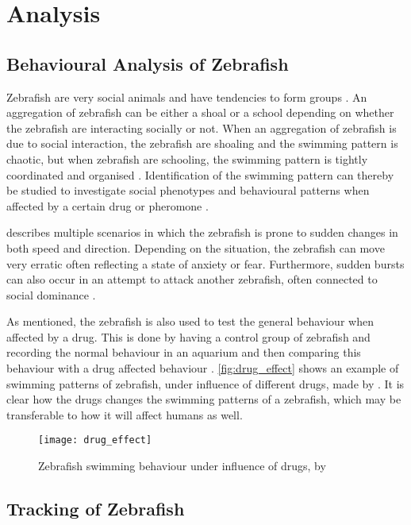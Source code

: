 \graphicspath{{figures/intro/}}
\chapter{Analysis}\label{ch:analysis}

\section{Behavioural Analysis of Zebrafish}
Zebrafish are very social animals and have tendencies to form groups \citep{RahmanKhan2018}. An aggregation of zebrafish can be either a shoal or a school depending on whether the zebrafish are interacting socially or not. When an aggregation of zebrafish is due to social interaction, the zebrafish are shoaling and the swimming pattern is chaotic, but when zebrafish are schooling, the swimming pattern is tightly coordinated and organised \citep{Miller2012a}. Identification of the swimming pattern can thereby be studied to investigate social phenotypes and behavioural patterns when affected by a certain drug or pheromone \citep{RahmanKhan2018}. 

\cite{Kalueff2013} describes multiple scenarios in which the zebrafish is prone to sudden changes in both speed and direction. Depending on the situation, the zebrafish can move very erratic often reflecting a state of anxiety or fear. Furthermore, sudden bursts can also occur in an attempt to attack another zebrafish, often connected to social dominance \citep{Kalueff2013}.

As mentioned, the zebrafish is also used to test the general behaviour when affected by a drug. This is done by having a control group of zebrafish and recording the normal behaviour in an aquarium and then comparing this behaviour with a drug affected behaviour \citep{Stewart2015}. \autoref{fig:drug_effect} shows an example of swimming patterns of zebrafish, under influence of different drugs, made by \cite{Stewart2015}. It is clear how the drugs changes the swimming patterns of a zebrafish, which may be transferable to how it will affect humans as well.\\ 

\begin{figure}[h]
	\centering
	\texttt{[image: drug\_effect]}
	\caption{Zebrafish swimming behaviour under influence of drugs, by \cite{Stewart2015}}
	\label{fig:drug_effect}
\end{figure}


\section{Tracking of Zebrafish}

